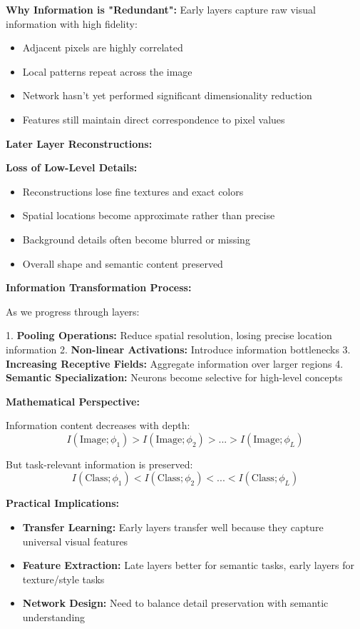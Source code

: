 \documentclass[12pt]{article}
\begin{document}
\begin{enumerate}[(a)]
{    \textbf{Why Information is "Redundant":}
    Early layers capture raw visual information with high fidelity:
    \begin{itemize}
        \item Adjacent pixels are highly correlated
        \item Local patterns repeat across the image
        \item Network hasn't yet performed significant dimensionality reduction
        \item Features still maintain direct correspondence to pixel values
    \end{itemize}
    
    \textbf{Later Layer Reconstructions:}
    
    \textbf{Loss of Low-Level Details:}
    \begin{itemize}
        \item Reconstructions lose fine textures and exact colors
        \item Spatial locations become approximate rather than precise
        \item Background details often become blurred or missing
        \item Overall shape and semantic content preserved
    \end{itemize}
    
    \textbf{Information Transformation Process:}
    
    As we progress through layers:
    
    1. \textbf{Pooling Operations:} Reduce spatial resolution, losing precise location information
    2. \textbf{Non-linear Activations:} Introduce information bottlenecks
    3. \textbf{Increasing Receptive Fields:} Aggregate information over larger regions
    4. \textbf{Semantic Specialization:} Neurons become selective for high-level concepts
    
    \textbf{Mathematical Perspective:}
    
    Information content decreases with depth:
    $$I(\text{Image}; \phi_1) > I(\text{Image}; \phi_2) > ... > I(\text{Image}; \phi_L)$$
    
    But task-relevant information is preserved:
    $$I(\text{Class}; \phi_1) < I(\text{Class}; \phi_2) < ... < I(\text{Class}; \phi_L)$$
    
    \textbf{Practical Implications:}
    \begin{itemize}
        \item \textbf{Transfer Learning:} Early layers transfer well because they capture universal visual features
        \item \textbf{Feature Extraction:} Late layers better for semantic tasks, early layers for texture/style tasks
        \item \textbf{Network Design:} Need to balance detail preservation with semantic understanding
    \end{itemize}
    }
    

\end{enumerate}
\end{document}
